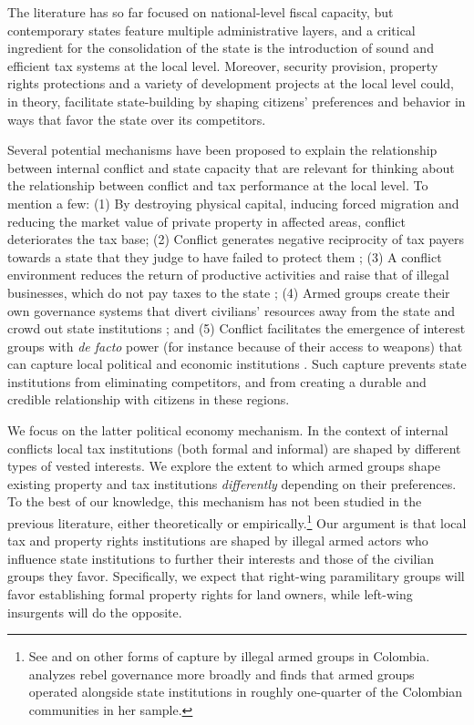 The literature has so far focused on national-level fiscal capacity, but contemporary states feature multiple administrative layers, and a critical ingredient for the consolidation of the state is the introduction of sound and efficient tax systems at the local level. Moreover, security provision, property rights protections and a variety of development projects at the local level could, in theory, facilitate state-building by shaping citizens' preferences and behavior in ways that favor the state over its competitors. 

Several potential mechanisms have been proposed to explain the relationship between internal conflict and state capacity that are relevant for thinking about the relationship between conflict and tax performance at the local level. To mention a few: (1) By destroying physical capital, inducing forced migration and reducing the market value of private property in affected areas, conflict deteriorates the tax base; (2) Conflict generates negative reciprocity of tax payers towards a state that they judge to have failed to protect them \citep{cardenaseslava14a}; (3) A conflict environment reduces the return of productive activities and raise that of illegal businesses, which do not pay taxes to the state \citep{besleypersson08a}; (4) Armed groups create their own governance systems that divert civilians' resources away from the state and crowd out state institutions \citep{mampilly11a, arjona16a, sanchez-de-la-sierra17a}; and (5) Conflict facilitates the emergence of interest groups with {\it de facto} power (for instance because of their access to weapons) that can capture local political and economic institutions \citep{eaton06a, lopez10a, mampilly11a}. Such capture prevents state institutions from eliminating competitors, and from creating a durable and credible relationship with citizens in these regions.

We focus on the latter political economy mechanism. In the context of internal conflicts local tax institutions (both formal and informal) are shaped by different types of vested interests. We explore the extent to which armed groups shape existing property and tax institutions \textit{differently} depending on their preferences. To the best of our knowledge, this mechanism has not been studied in the previous literature, either theoretically or empirically.\footnote{See \citet{eaton06a} and \citet{lopez10a} on other forms of capture by illegal armed groups in Colombia. \citet{mampilly11a} analyzes rebel governance more broadly and \citet{arjona14a} finds that armed groups operated alongside state institutions in roughly one-quarter of the Colombian communities in her sample.} Our argument is that local tax and property rights institutions are shaped by illegal armed actors who influence state institutions to further their interests and those of the civilian groups they favor. Specifically, we expect that right-wing paramilitary groups will favor establishing formal property rights for land owners, while left-wing insurgents will do the opposite.

